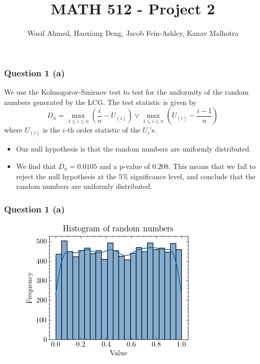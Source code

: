 \documentclass[compress,12pt]{beamer}
\title{MATH 512 - Project 2}
\subtitle{}
\date{}
\author{Wasif Ahmed, Haoxiang Deng, Jacob Fein-Ashley, Kanav Malhotra}
\begin{document}
\frame[plain]{\titlepage}


\begin{frame}
      \frametitle{Question 1 (a)}
      We use the Kolmogorov-Smirnov test to test for the uniformity of the random numbers generated by the LCG. The test statistic is given by
      \begin{equation*}
            D_n = \max_{1 \leq i \leq n} \left( \frac{i}{n} - U_{(i)} \right) \vee \max_{1 \leq i \leq n} \left( U_{(i)} - \frac{i-1}{n} \right)
      \end{equation*}
      where $U_{(i)}$ is the $i$-th order statistic of the $U_i$'s. 
      
      \begin{itemize}
            \item Our null hypothesis is that the random numbers are uniformly distributed.
            \item  We find that $D_n = 0.0105$ and a p-value of $ 0.208$. This means that we fail to reject the null hypothesis at the 5\% significance level, and conclude that the random numbers are uniformly distributed.
      \end{itemize}
\end{frame}

\begin{frame}
      \frametitle{Question 1 (a)}
      \begin{figure}
            \centering
            \includegraphics[scale=0.7]{imgs/1a.png}
      \end{figure}
\end{frame}
\end{document}
